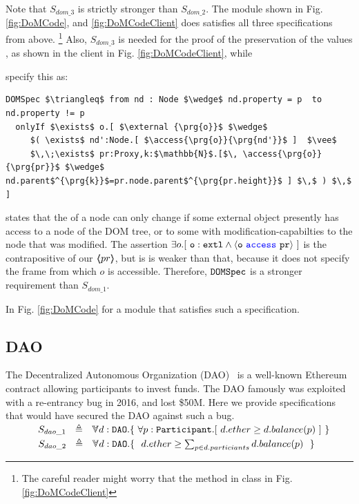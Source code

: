 Note that $S_{dom\_3}$ is strictly stronger than $S_{dom\_2}$. 
The module shown in Fig. \ref{fig:DoMCode}, and \ref{fig:DoMCodeClient} does satisfies all three specifications from above. 
\footnote{The careful reader might worry that the method  in class  in Fig. \ref{fig:DoMCodeClient} 

}
Also,  $S_{dom\_3}$ is needed 
for the proof of the preservation of the  values , as shown in the client in Fig. \ref{fig:DoMCodeClient}, while  



\vspace{.1cm}

\citet{OOPSLA22} specify this as:
 
 \begin{lstlisting}[language = Chainmail, mathescape=true, frame=lines]
DOMSpec $\triangleq$ from nd : Node $\wedge$ nd.property = p  to nd.property != p
  onlyIf $\exists$ o.[ $\external {\prg{o}}$ $\wedge$ 
     $( \exists$ nd':Node.[ $\access{\prg{o}}{\prg{nd'}}$ ]  $\vee$ 
     $\,\;\exists$ pr:Proxy,k:$\mathbb{N}$.[$\, \access{\prg{o}}{\prg{pr}}$ $\wedge$ nd.parent$^{\prg{k}}$=pr.node.parent$^{\prg{pr.height}}$ ] $\,$ ) $\,$ ]
\end{lstlisting}

 states that the  of a node can only change if
some external object presently has 
access to a node of the DOM tree, or to some  with modification-capabilties
to the node that was modified.
The assertion $\exists {o}.[\ \mbox{\normalfont{\texttt{o}}}:\mbox{\normalfont{\texttt{extl}}} \wedge \langle \mbox{\normalfont{\texttt{o}}}\ {\color{blue}\texttt{access}}\ \mbox{\normalfont{\texttt{pr}}} \rangle\ ]$ is the contrapositive of our  $\langle\!\!\langle pr \rangle\!\!\rangle$, but is is weaker than that, because it does not specify the frame from which $o$ is accessible.
Therefore, $\mbox{\normalfont{\texttt{DOMSpec}}}$ is a stronger requirement than $S_{dom\_1}$.

In Fig. \ref{fig:DoMCode} for a module that satisfies such a specification. 






\subsection{DAO}
The Decentralized Autonomous Organization (DAO)~\cite{Dao}  is a well-known Ethereum contract allowing 
participants to invest funds. The DAO famously was exploited with a re-entrancy bug in 2016, 
and lost \$50M. Here we provide specifications that would have secured the DAO against such a 
bug. 
\\ 
$\strut \SPSP  S_{dao\_1}\ \  \triangleq \ \ \TwoStatesN{ d:\prg{DAO}}{\ \forall p:\prg{Participant}. [\ d.ether \geq d.balance(p) \ ]   \ }$ 
\\
$\strut \SPSP  S_{dao\_2}\ \  \triangleq \ \ \TwoStatesN{ d:\prg{DAO}}{\ \ d.ether \geq \sum_{p \in d.particiants} d.balance(p)\  \ }$ 


